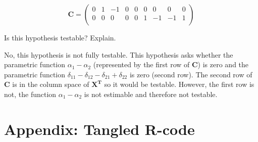 \documentclass[11pt]{article}
\begin{document}
\[
\mathbf{C} =
\begin{pmatrix}{}
    0 &   1 &  -1 &   0 &   0 &   0 &   0 &   0 &   0 \\ 
    0 &   0 &   0 &   0 &   0 &   1 &  -1 &  -1 &   1 \\ 
  \end{pmatrix}
\]

Is this hypothesis testable? Explain.


No, this hypothesis is not fully testable. This hypothesis asks whether the
parametric function $\alpha_1 - \alpha_2$ (represented by the first 
row of \textbf{C}) is zero and the parametric function 
$\delta_11 - \delta_12 - \delta_21 + \delta_22$ is zero (second row). 
The second row of $\mathbf{C}$ is in the
column space of $\mathbf{X^T}$ so it would be testable. However, the
first row is not, the function $\alpha_1 - \alpha_2$ is not estimable
and therefore not testable.
\section{Appendix: Tangled R-code}
\label{sec-6}


\end{document}
